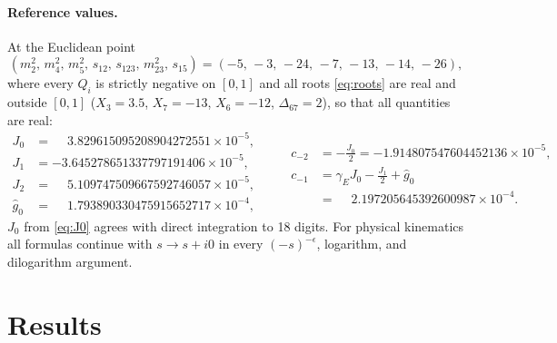 \documentclass[11pt]{article}
\newcommand{\eps}{\epsilon}
\begin{document}
\paragraph{Reference values.}
At the Euclidean point
\begin{equation}
(m_2^2,\,m_4^2,\,m_5^2,\,s_{12},\,s_{123},\,m_{23}^2,\,s_{15})
=(-5,\,-3,\,-24,\,-7,\,-13,\,-14,\,-26),
\label{eq:euclpoint}
\end{equation}
where every $Q_i$ is strictly negative on $[0,1]$ and all roots \eqref{eq:roots} are real and
outside $[0,1]$ ($X_3=3.5$, $X_7=-13$, $X_6=-12$, $\Delta_{67}=2$), so that all quantities are
real:
\begin{equation}
\begin{aligned}
J_0&=\phantom{-}3.829615095208904272551\times10^{-5},\\
J_1&=-3.645278651337797191406\times10^{-5},\\
J_2&=\phantom{-}5.109747509667592746057\times10^{-5},\\
\hat g_0&=\phantom{-}1.793890330475915652717\times10^{-4},
\end{aligned}
\qquad
\begin{aligned}
c_{-2}&=-\tfrac{J_0}{2}=-1.914807547604452136\times10^{-5},\\[2pt]
c_{-1}&=\gamma_EJ_0-\tfrac{J_1}{2}+\hat g_0\\
&=\phantom{-}2.197205645392600987\times10^{-4} .
\end{aligned}
\label{eq:refvals}
\end{equation}
$J_0$ from \eqref{eq:J0} agrees with direct integration to 18 digits. For physical kinematics all
formulas continue with $s\to s+i0$ in every $(-s)^{-\eps}$, logarithm, and dilogarithm argument.

\section{Results}
\label{sec:results}
\end{document}
